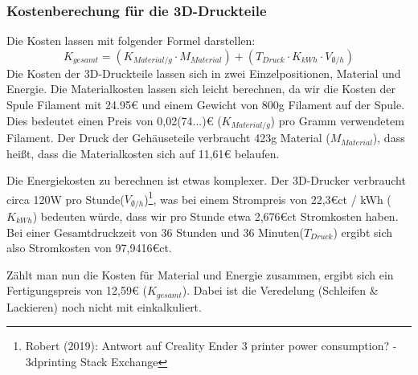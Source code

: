 \subsubsection{Kostenberechung für die 3D-Druckteile}
\noindent Die Kosten lassen mit folgender Formel darstellen:\\
\[
K_{gesamt} =  (K_{Material/g} \cdot M_{Material}) +  (T_{Druck} \cdot  K_{kWh} \cdot V_{\emptyset/h})
\]
Die Kosten der 3D-Druckteile lassen sich in zwei Einzelpositionen, Material und Energie.
Die Materialkosten lassen sich leicht berechnen, da wir die Kosten der Spule Filament mit 24.95\euro{} und einem Gewicht von 800g Filament auf der Spule.
Dies bedeutet einen Preis von 0,02(74...)\euro{} ($K_{Material/g}$) pro Gramm verwendetem Filament.
Der Druck der Gehäuseteile verbraucht 423g Material ($M_{Material}$), dass heißt, dass die Materialkosten sich auf 11,61\euro{} belaufen.\par
\noindent Die Energiekosten zu berechnen ist etwas komplexer.
Der 3D-Drucker verbraucht circa 120W pro Stunde($V_{\emptyset/h}$)\footnote{Robert (2019): Antwort auf Creality Ender 3 printer power consumption? - 3dprinting Stack Exchange}, was bei einem Strompreis von 22,3\euro{}ct / kWh ($K_{kWh}$) bedeuten würde, dass wir pro Stunde etwa 2,676\euro{}ct Stromkosten haben. 
Bei einer Gesamtdruckzeit von 36 Stunden und 36 Minuten($T_{Druck}$) ergibt sich also Stromkosten von 97,9416\euro{}ct.\par
\noindent Zählt man nun die Kosten für Material und Energie zusammen, ergibt sich ein Fertigungspreis von 12,59\euro{} ($K_{gesamt}$). 
Dabei ist die Veredelung (Schleifen \& Lackieren) noch nicht mit einkalkuliert.\par

